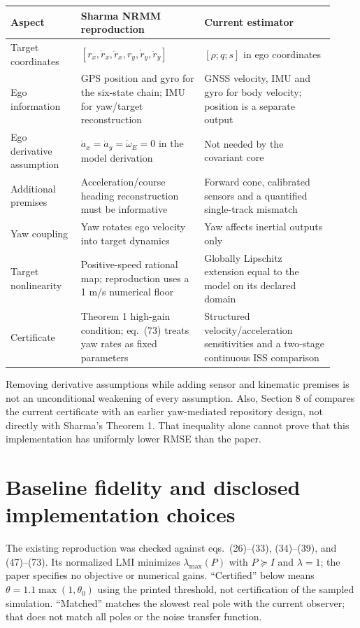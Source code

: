 \documentclass[11pt]{article}
\begin{document}
\begin{longtable}{@{}p{0.20\linewidth}p{0.35\linewidth}p{0.37\linewidth}@{}}
\toprule
Aspect & Sharma NRMM reproduction & Current estimator \\
\midrule
Target coordinates & $[r_x,\dot r_x,\ddot r_x,r_y,\dot r_y,\ddot r_y]$ & $[\rho;q;s]$ in ego coordinates \\
Ego information & GPS position and gyro for the six-state chain; IMU for yaw/target reconstruction & GNSS velocity, IMU and gyro for body velocity; position is a separate output \\
Ego derivative assumption & $\dot a_x=\dot a_y=\dot\omega_E=0$ in the model derivation & Not needed by the covariant core \\
Additional premises & Acceleration/course heading reconstruction must be informative & Forward cone, calibrated sensors and a quantified single-track mismatch \\
Yaw coupling & Yaw rotates ego velocity into target dynamics & Yaw affects inertial outputs only \\
Target nonlinearity & Positive-speed rational map; reproduction uses a 1 m/s numerical floor & Globally Lipschitz extension equal to the model on its declared domain \\
Certificate & Theorem 1 high-gain condition; eq.~(73) treats yaw rates as fixed parameters & Structured velocity/acceleration sensitivities and a two-stage continuous ISS comparison \\
\bottomrule
\end{longtable}

Removing derivative assumptions while adding sensor and kinematic premises is
not an unconditional weakening of every assumption. Also, Section 8 of
 compares the current certificate with
an earlier yaw-mediated repository design, not directly with Sharma's
Theorem 1. That inequality alone cannot prove that this implementation has
uniformly lower RMSE than the paper.

\section{Baseline fidelity and disclosed implementation choices}
The existing reproduction was checked against eqs.~(26)--(33), (34)--(39),
and (47)--(73). Its normalized LMI minimizes $\lambda_{\max}(P)$ with
$P\succeq I$ and $\lambda=1$; the paper specifies no objective or numerical
gains. ``Certified'' below means $\theta=1.1\max(1,\theta_0)$ using the
printed threshold, not certification of the sampled simulation. ``Matched''
matches the slowest real pole with the current observer; that does not match
all poles or the noise transfer function.
\end{document}

